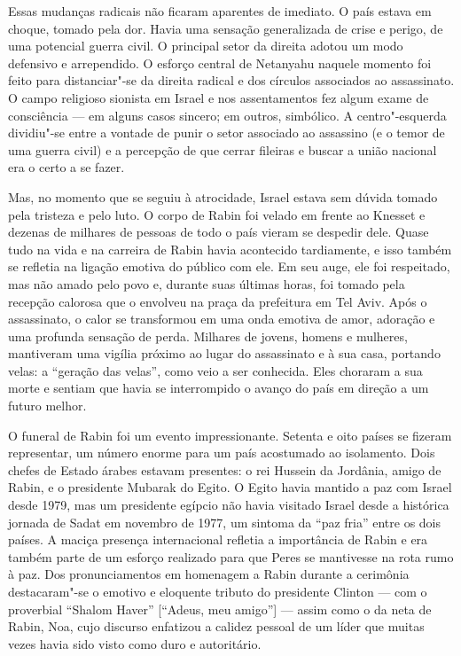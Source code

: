 Essas mudanças radicais não ficaram aparentes de imediato. O país estava
em choque, tomado pela dor. Havia uma sensação generalizada de crise e
perigo, de uma potencial guerra civil. O principal setor da direita
adotou um modo defensivo e arrependido. O esforço central de Netanyahu
naquele momento foi feito para distanciar"-se da direita radical e dos
círculos associados ao assassinato. O campo religioso sionista em Israel
e nos assentamentos fez algum exame de consciência --- em alguns casos
sincero; em outros, simbólico. A centro"-esquerda dividiu"-se entre a
vontade de punir o setor associado ao assassino (e o temor de uma
guerra civil) e a percepção de que cerrar fileiras e buscar a união
nacional era o certo a se fazer.

Mas, no momento que se seguiu à atrocidade, Israel estava sem dúvida
tomado pela tristeza e pelo luto. O corpo de Rabin foi velado em frente
ao Knesset e dezenas de milhares de pessoas de todo o país vieram se
despedir dele. Quase tudo na vida e na carreira de Rabin havia
acontecido tardiamente, e isso também se refletia na ligação emotiva do
público com ele. Em seu auge, ele foi respeitado, mas não amado pelo
povo e, durante suas últimas horas, foi tomado pela recepção
calorosa que o envolveu na praça da prefeitura em Tel Aviv. Após o
assassinato, o calor se transformou em uma onda emotiva de amor,
adoração e uma profunda sensação de perda. Milhares de jovens, homens e
mulheres, mantiveram uma vigília próximo ao lugar do assassinato e à sua
casa, portando velas: a ``geração das velas'', como veio a ser
conhecida. Eles choraram a sua morte e sentiam que havia se interrompido
o avanço do país em direção a um futuro melhor.

O funeral de Rabin foi um evento impressionante. Setenta e oito países
se fizeram representar, um número enorme para um país acostumado ao
isolamento. Dois chefes de Estado árabes estavam presentes: o rei
Hussein da Jordânia, amigo de Rabin, e o presidente Mubarak do Egito.
O Egito havia mantido a paz com Israel desde 1979, mas um presidente
egípcio não havia visitado Israel desde a histórica jornada de Sadat em
novembro de 1977, um sintoma da ``paz fria'' entre os dois países. A
maciça presença internacional refletia a importância de Rabin e era
também parte de um esforço realizado para que Peres se mantivesse na
rota rumo à paz. Dos pronunciamentos em homenagem a Rabin durante a cerimônia
destacaram"-se o emotivo e eloquente tributo do presidente Clinton --- com
o proverbial ``Shalom Haver'' {[}``Adeus, meu amigo''{]} --- assim como o da
neta de Rabin, Noa, cujo discurso enfatizou a calidez pessoal de um
líder que muitas vezes havia sido visto como duro e autoritário.

